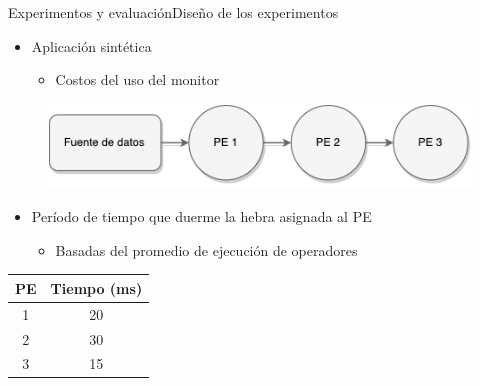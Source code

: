 \begin{frame}{Experimentos y evaluación}{Diseño de los experimentos}
\begin{itemize}
	\item Aplicación sintética
	\begin{itemize}
		\item Costos del uso del monitor
	\end{itemize}
\end{itemize}
\begin{figure}[!ht]
	\centering
		\includegraphics[scale=0.65]{images/App3.pdf}
\end{figure}
\begin{itemize}
	\item Período de tiempo que duerme la hebra asignada al PE
	\begin{itemize}
		\item Basadas del promedio de ejecución de operadores
	\end{itemize}
\end{itemize}
\begin{table}[!ht]
\footnotesize
\centering
\begin{tabular}{| c | c |}
\hline
PE & Tiempo (ms) \\ \hline
1 & 20 \\
2 & 30 \\
3 & 15 \\\hline
\end{tabular}
\end{table}
\end{frame}

